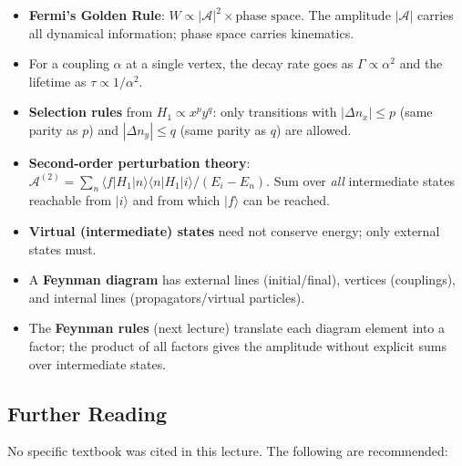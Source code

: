 \begin{itemize}
  \item \textbf{Fermi's Golden Rule}: $W \propto |\mathcal{A}|^2 \times \text{phase space}$.  The amplitude $|\mathcal{A}|$ carries all dynamical information; phase space carries kinematics.
  \item For a coupling $\alpha$ at a single vertex, the decay rate goes as $\Gamma \propto \alpha^2$ and the lifetime as $\tau \propto 1/\alpha^2$.
  \item \textbf{Selection rules} from $H_1 \propto x^p y^q$: only transitions with $|\Delta n_x| \leq p$ (same parity as $p$) and $|\Delta n_y| \leq q$ (same parity as $q$) are allowed.
  \item \textbf{Second-order perturbation theory}: $\mathcal{A}^{(2)} = \sum_n \langle f|H_1|n\rangle\langle n|H_1|i\rangle/(E_i-E_n)$.  Sum over \emph{all} intermediate states reachable from $|i\rangle$ and from which $|f\rangle$ can be reached.
  \item \textbf{Virtual (intermediate) states} need not conserve energy; only external states must.
  \item A \textbf{Feynman diagram} has external lines (initial/final), vertices (couplings), and internal lines (propagators/virtual particles).
  \item The \textbf{Feynman rules} (next lecture) translate each diagram element into a factor; the product of all factors gives the amplitude without explicit sums over intermediate states.
\end{itemize}

\subsection*{Further Reading}

No specific textbook was cited in this lecture.  The following are recommended:

